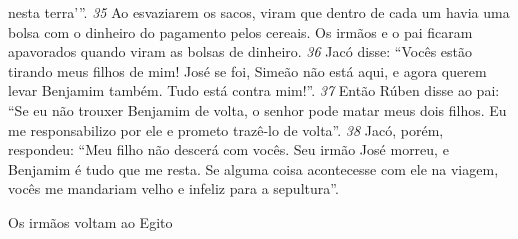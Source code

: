 nesta terra’”.
\textit{\tiny 35}
Ao esvaziarem os sacos, viram que dentro de cada um havia uma bolsa com o
dinheiro do pagamento pelos cereais. Os irmãos e o pai ficaram apavorados
quando viram as bolsas de dinheiro. 
\textit{\tiny 36}
Jacó disse: “Vocês estão tirando meus
filhos de mim! José se foi, Simeão não está aqui, e agora querem levar Benjamim
também. Tudo está contra mim!”.
\textit{\tiny 37}
Então Rúben disse ao pai: “Se eu não trouxer Benjamim de volta, o senhor
pode matar meus dois filhos. Eu me responsabilizo por ele e prometo trazê-lo de
volta”.
\textit{\tiny 38}
Jacó, porém, respondeu: “Meu filho não descerá com vocês. Seu irmão José
morreu, e Benjamim é tudo que me resta. Se alguma coisa acontecesse com ele na
viagem, vocês me mandariam velho e infeliz para a sepultura”.

\bigskip
Os irmãos voltam ao Egito
   
